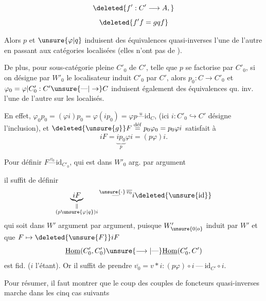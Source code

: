 \[ \deleted{f':C'\longrightarrow A,} \]
\[ \deleted{f'f=gqf} \]

Alors $p$ et $\unsure{\varphi|q}$ induisent des  équivalences quasi-inverses l'une de l'autre en passant aux catégories localisées (elles n'ont pas de ).

De plus, pour  sous-catégorie pleine $C'_0$ de $C'$, telle que  $p$ se factorise  par $C'_0$, si on désigne par $W'_0$ le localisateur induit  $C'_0$ par $C'$,  alors $p_0:C\to C'_0$ et $\varphi_0=\varphi\vert C'_0:C'\unsure{\text{---}|\to}C$ induisent également des équivalences qu. inv. l'une de l'autre sur les localisés.

En effet, $\varphi_0p_0=(\varphi i)p_0=\varphi(ip_0)=\varphi p\overset{u}{\text{---}}\mathrm{id}_C$, (ici $i:C'_0\hookrightarrow C'$ désigne l'inclusion), et $\deleted{\unsure{g}}F\overset{\mathrm{d\acute ef}}{=}p_0\varphi_0=p_0\varphi i$ satisfait à
\[ iF=\underbrace{ip_0}_{p}\varphi i=(p\varphi)i. \]

Pour définir  $F\overset{v_0}{\text{---}}\mathrm{id}_{C'_0}$, qui est dans $W'_0$ arg. par argument


il suffit de définir
\[ \underbrace{iF}_{\substack{\Vert\\(p\unsure{\varphi|q})i}}\overset{\unsure{\cdot}\,\overline{v_0}}{\text{---}}i\deleted{\unsure{\mathrm{id}}} \]
qui soit dans $W'$ argument par argument, puisque $W'_{\unsure{0|o}}$ induit par $W'$ et que $F\mapsto\deleted{\unsure{F}}iF$
\[ \underline{\mathrm{Hom}}(C'_0,C'_0)\unsure{\longrightarrow|\text{---}}\underline{\mathrm{Hom}}(C'_0,C') \]
est  fid. ($i$ l'étant). Or il suffit de prendre $\overline{v_0}=v*i:(p\varphi)\circ i\ \text{---}\ \mathrm{id}_{C'}\circ i$.

Pour résumer, il faut montrer que le coup des couples de foncteurs quasi-inverses marche dans les cinq cas suivants 

